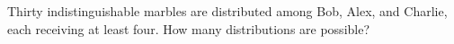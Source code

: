 Thirty indistinguishable marbles are distributed among Bob, Alex, and Charlie, each receiving at least four. How many distributions are possible?
